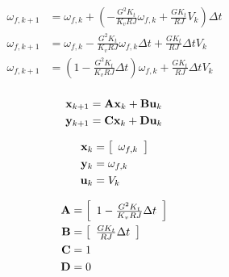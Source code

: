 \begin{align}
  \omega_{f,k+1} &= \omega_{f,k} + \left(-\frac{G^2 K_t}{K_v RJ} \omega_{f,k} +
    \frac{G K_t}{RJ} V_k\right) \Delta t \nonumber \\
  \omega_{f,k+1} &= \omega_{f,k} - \frac{G^2 K_t}{K_v RJ} \omega_{f,k}
    \Delta t + \frac{G K_t}{RJ} \Delta t V_k \nonumber \\
  \omega_{f,k+1} &= \left(1 - \frac{G^2 K_t}{K_v RJ} \Delta t\right)
    \omega_{f,k} + \frac{G K_t}{RJ} \Delta t V_k \nonumber \\
\end{align}

\begin{align*}
  \mathbf{x}_{k+1} &= \mathbf{A} \mathbf{x}_k + \mathbf{B} \mathbf{u}_k \\
  \mathbf{y}_{k+1} &= \mathbf{C} \mathbf{x}_k + \mathbf{D} \mathbf{u}_k
\end{align*}

\begin{align*}
  \mathbf{x}_k &= \left[
  \begin{array}{c}
    \omega_{f,k}
  \end{array}
  \right] \\
  \mathbf{y}_k &= \omega_{f,k} \\
  \mathbf{u}_k &= V_k
\end{align*}

\begin{align}
  \mathbf{A} &= \left[
  \begin{array}{c}
    1 - \frac{G^2 K_t}{K_v RJ} \Delta t
  \end{array}
  \right] \\
  \mathbf{B} &= \left[
  \begin{array}{c}
    \frac{G K_t}{RJ} \Delta t
  \end{array}
  \right] \\
  \mathbf{C} &= 1 \\
  \mathbf{D} &= 0
\end{align}
